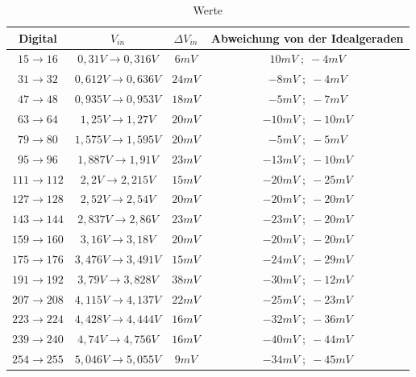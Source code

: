 \documentclass[12pt, a4paper, ngerman]{article}
\begin{document}
\begin{table}[h]
  \centering
  \begin{tabular}{|c|c|c|c|}
    \hline
    Digital              & $V_{in}$                   & $\Delta V_{in}$ & Abweichung von der Idealgeraden \\\hline
    $15\rightarrow 16$   & $0,31V\rightarrow 0,316V$  & $6mV$           & $10mV\;;\;-4mV$                 \\\hline
    $31\rightarrow 32$   & $0,612V\rightarrow 0,636V$ & $24mV$          & $-8mV\;;\; -4mV$                \\\hline
    $47\rightarrow 48$   & $0,935V\rightarrow 0,953V$ & $18mV$          & $-5mV\;;\; -7mV$                \\\hline
    $63\rightarrow 64$   & $1,25V\rightarrow 1,27 V$  & $20mV$          & $-10mV\;;\;-10mV$               \\\hline
    $79\rightarrow 80$   & $1,575V\rightarrow 1,595V$ & $20mV$          & $-5mV\;;\; -5mV$                \\\hline
    $95\rightarrow 96$   & $1,887V\rightarrow 1,91 V$ & $23mV$          & $-13mV\;;\;-10mV$               \\\hline
    $111\rightarrow 112$ & $2,2V\rightarrow 2,215V$   & $15mV$          & $-20mV\;;\;-25mV$               \\\hline
    $127\rightarrow 128$ & $2,52V\rightarrow 2,54 V$  & $20mV$          & $-20mV\;;\;-20mV$               \\\hline
    $143\rightarrow 144$ & $2,837V\rightarrow 2,86 V$ & $23mV$          & $-23mV\;;\;-20mV$               \\\hline
    $159\rightarrow 160$ & $3,16V\rightarrow 3,18 V$  & $20mV$          & $-20mV\;;\;-20mV$               \\\hline
    $175\rightarrow 176$ & $3,476V\rightarrow 3,491V$ & $15mV$          & $-24mV\;;\;-29mV$               \\\hline
    $191\rightarrow 192$ & $3,79V\rightarrow 3,828V$  & $38mV$          & $-30mV\;;\;-12mV$               \\\hline
    $207\rightarrow 208$ & $4,115V\rightarrow 4,137V$ & $22mV$          & $-25mV\;;\;-23mV$               \\\hline
    $223\rightarrow 224$ & $4,428V\rightarrow 4,444V$ & $16mV$          & $-32mV\;;\;-36mV$               \\\hline
    $239\rightarrow 240$ & $4,74V\rightarrow 4,756V$  & $16mV$          & $-40mV\;;\;-44mV$               \\\hline
    $254\rightarrow 255$ & $5,046V\rightarrow 5,055V$ & $9mV$           & $-34mV\;;\;-45mV$               \\\hline
  \end{tabular}
  \caption{Werte}
  \label{table:1}
\end{table}
\end{document}

